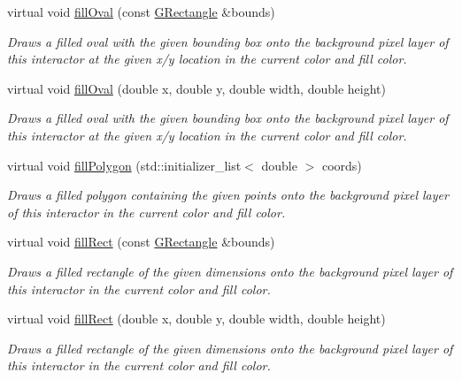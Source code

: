 \begin{DoxyCompactItemize}
virtual void \mbox{\hyperlink{classGDrawingSurface_a1ea6e48d59fb588797dba4deab1397e0}{fill\+Oval}} (const \mbox{\hyperlink{classGRectangle}{G\+Rectangle}} \&bounds)
\begin{DoxyCompactList}\small\item\em Draws a filled oval with the given bounding box onto the background pixel layer of this interactor at the given x/y location in the current color and fill color. \end{DoxyCompactList}\item 
virtual void \mbox{\hyperlink{classGDrawingSurface_a28c700c82f31cd328a4629273420ee61}{fill\+Oval}} (double x, double y, double width, double height)
\begin{DoxyCompactList}\small\item\em Draws a filled oval with the given bounding box onto the background pixel layer of this interactor at the given x/y location in the current color and fill color. \end{DoxyCompactList}\item 
virtual void \mbox{\hyperlink{classGDrawingSurface_a15f8c1c4409ef51c1a30a92a195b8f66}{fill\+Polygon}} (std\+::initializer\+\_\+list$<$ double $>$ coords)
\begin{DoxyCompactList}\small\item\em Draws a filled polygon containing the given points onto the background pixel layer of this interactor in the current color and fill color. \end{DoxyCompactList}\item 
virtual void \mbox{\hyperlink{classGDrawingSurface_ae6582295003bf2488836b1993dadbad7}{fill\+Rect}} (const \mbox{\hyperlink{classGRectangle}{G\+Rectangle}} \&bounds)
\begin{DoxyCompactList}\small\item\em Draws a filled rectangle of the given dimensions onto the background pixel layer of this interactor in the current color and fill color. \end{DoxyCompactList}\item 
virtual void \mbox{\hyperlink{classGDrawingSurface_aac3ae7d3aee950de78eca0e108352254}{fill\+Rect}} (double x, double y, double width, double height)
\begin{DoxyCompactList}\small\item\em Draws a filled rectangle of the given dimensions onto the background pixel layer of this interactor in the current color and fill color. \end{DoxyCompactList}\item 

\end{DoxyCompactItemize}
